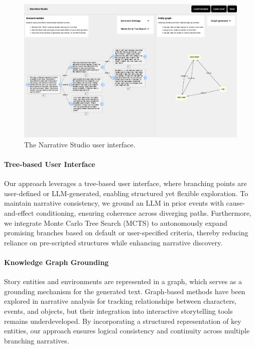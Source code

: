 \documentclass[11pt]{article}
\begin{document}
\begin{figure}[t]
  \centering
  \includegraphics[width=\textwidth]{figures/ui.png}
  \caption{The Narrative Studio user interface.}
  \label{fig:ui}
\end{figure}

\paragraph{Tree-based User Interface} Our approach leverages a tree-based user interface, where branching points are user-defined or LLM-generated, enabling structured yet flexible exploration. To maintain narrative consistency, we ground an LLM in prior events with cause-and-effect conditioning, ensuring coherence across diverging paths. Furthermore, we integrate Monte Carlo Tree Search (MCTS) to autonomously expand promising branches based on default or user-specified criteria, thereby reducing reliance on pre-scripted structures while enhancing narrative discovery.

\paragraph{Knowledge Graph Grounding} Story entities and environments are represented in a graph, which serves as a grounding mechanism for the generated text. Graph-based methods have been explored in narrative analysis for tracking relationships between characters, events, and objects, but their integration into interactive storytelling tools remains underdeveloped. By incorporating a structured representation of key entities, our approach ensures logical consistency and continuity across multiple branching narratives.
\end{document}
